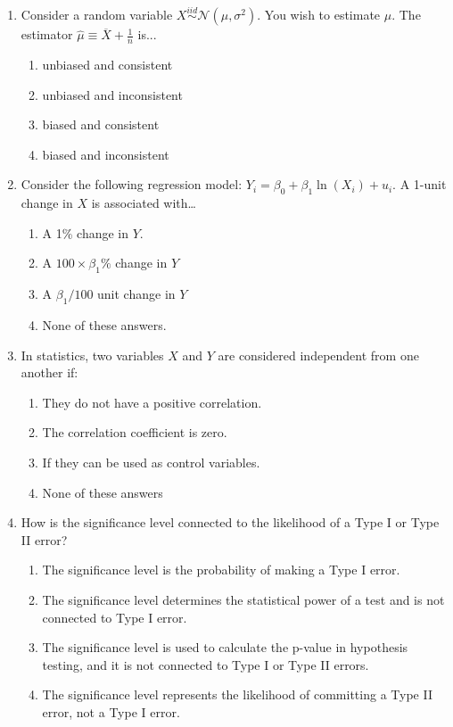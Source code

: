 \documentclass{article}
\begin{document}
\begin{enumerate}
\item Consider a random variable $X\stackrel{iid}{\sim}\mathcal{N}(\mu, \sigma^2)$. You wish to estimate $\mu$. The estimator $\hat{\mu}\equiv \overline{X} + \frac{1}{n} $ is...

\begin{enumerate}[label=\alph*)]
\item unbiased and consistent
\item unbiased and inconsistent
\item {\color{blue} biased and consistent}
\item biased and inconsistent
\end{enumerate}\vspace{.25cm}

\item Consider the following regression model: $Y_i = \beta_0 + \beta_1 \ln(X_i) + u_i$. A 1-unit change in $X$ is associated with…
\begin{enumerate}[label=\alph*)]
        \item A 1\% change in $Y$.
        \item A $100 \times \beta_1 \%$ change in $Y$
        \item A $\beta_1/100$ unit change in $Y$
        \item {\color{blue} None of these answers.}
\end{enumerate}\vspace{.25cm}

\item In statistics, two variables \(X\) and \(Y\) are considered independent from one another if:
    \begin{enumerate}[label=\alph*)]
        \item They do not have a positive correlation.
        \item The correlation coefficient is zero.
        \item If they can be used as control variables.
        \item {\color{blue} None of these answers}
    \end{enumerate}\vspace{.25cm}

    \newpage

\item How is the significance level connected to the likelihood of a Type I or Type II error?

\begin{enumerate}[label=\alph*)]
  \item {\color{blue} The significance level is the probability of making a Type I error.}
  \item The significance level determines the statistical power of a test and is not connected to Type I error.
  \item The significance level is used to calculate the p-value in hypothesis testing, and it is not connected to Type I or Type II errors.
  \item The significance level represents the likelihood of committing a Type II error, not a Type I error.
\end{enumerate}\vspace{.25cm}


\end{enumerate}
\end{document}
